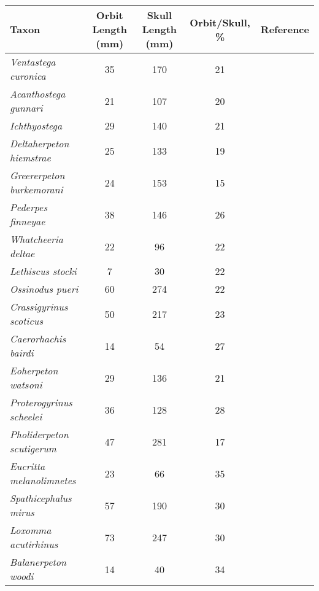 \begin{tabular}{|L{4.5cm}|c|c|c|L{4.5cm}|}
\hline
\textbf{Taxon}&\textbf{Orbit Length (mm)}&\textbf{Skull Length (mm)}&\textbf{Orbit/Skull, \%}&\textbf{Reference}\\\hline
\textit{Ventastega curonica}&35&170&21&\citet{Ahlb08a}\\\hline
\textit{Acanthostega gunnari}&21&107&20&\citet{Clac02b,Porr15a}\\\hline
\textit{Ichthyostega}&29&140&21&\citet{Bent90a}\\\hline
\textit{Deltaherpeton hiemstrae}&25&133&19&\citet{Bolt10a}\\\hline
\textit{Greererpeton burkemorani}&24&153&15&\citet{Bent90a}\\\hline
\textit{Pederpes finneyae}&38&146&26&\citet{Clac02a}\\\hline
\textit{Whatcheeria deltae}&22&96&22&\citet{Lomb95a}\\\hline
\textit{Lethiscus stocki}&7&30&22&\citet{Well82a}\\\hline
\textit{Ossinodus pueri}&60&274&22&\citet{Warr04a,Warr07a}\\\hline
\textit{Crassigyrinus scoticus}&50&217&23&\citet{Panc85a}\\\hline
\textit{Caerorhachis bairdi}&14&54&27&\citet{Holm77a}\\\hline
\textit{Eoherpeton watsoni}&29&136&21&\citet{Smit85a}\\\hline
\textit{Proterogyrinus scheelei}&36&128&28&\citet{Holm84a}\\\hline
\textit{Pholiderpeton scutigerum}&47&281&17&\citet{Clac87a}\\\hline
\textit{Eucritta melanolimnetes}&23&66&35&\citet{Clac98a}\\\hline
\textit{Spathicephalus mirus}&57&190&30&\citet{Beau98a}\\\hline
\textit{Loxomma acutirhinus}&73&247&30&\citet{Beau77a}\\\hline
\textit{Balanerpeton woodi}&14&40&34&\citet{Miln94a}\\\hline
\end{tabular}
